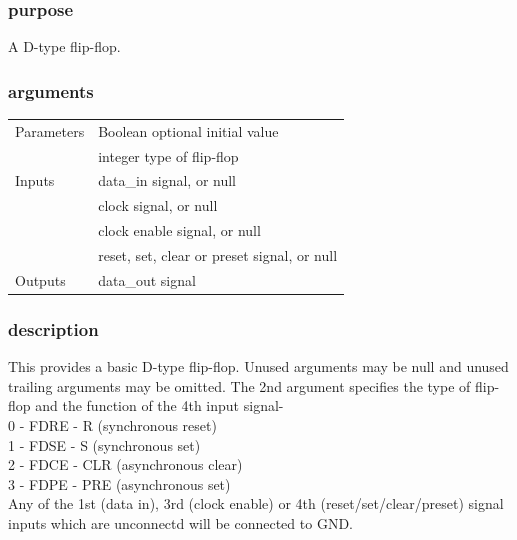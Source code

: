             \subsubsection{purpose}
            
                A D-type flip-flop.

            \subsubsection{arguments}
            
                \begin{tabular}{| l | l |}
                \hline
                Parameters  & Boolean optional initial value \\
                            & integer type of flip-flop \\
                \hline
                Inputs      & data\_in signal, or null \\
                            & clock signal, or null \\
                            & clock enable signal, or null \\
                            & reset, set, clear or preset signal, or null \\
                \hline
                Outputs     & data\_out signal \\
                \hline
                \end{tabular}

            \subsubsection{description}

                This provides a basic D-type flip-flop. Unused arguments may be
                null and unused trailing arguments may be omitted.
                The 2nd argument specifies the type of flip-flop and the
                function of the 4th input signal-\\
                0 - FDRE - R (synchronous reset)\\
                1 - FDSE - S (synchronous set)\\
                2 - FDCE - CLR (asynchronous clear)\\
                3 - FDPE - PRE (asynchronous set)\\
                Any of the 1st (data in), 3rd (clock enable) or 4th
                (reset/set/clear/preset) signal inputs which are unconnectd
                will be connected to GND.
            
